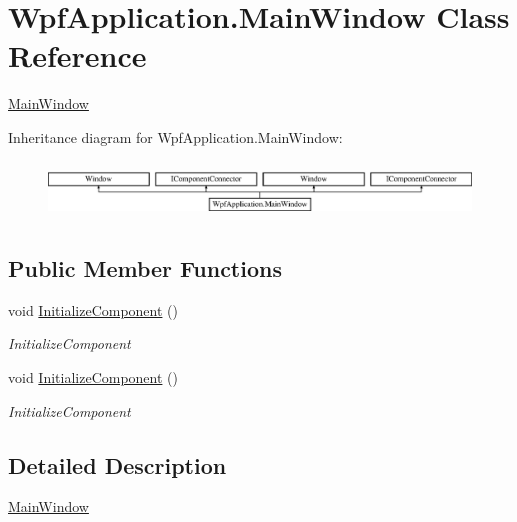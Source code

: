 \hypertarget{class_wpf_application_1_1_main_window}{\section{Wpf\-Application.\-Main\-Window Class Reference}
\label{class_wpf_application_1_1_main_window}
}


\hyperlink{class_wpf_application_1_1_main_window}{Main\-Window}  


Inheritance diagram for Wpf\-Application.\-Main\-Window\-:\begin{figure}[H]
\begin{center}
\leavevmode
\includegraphics[height=1.546961cm]{class_wpf_application_1_1_main_window}
\end{center}
\end{figure}
\subsection*{Public Member Functions}
\begin{DoxyCompactItemize}
\item 
void \hyperlink{class_wpf_application_1_1_main_window_a45cac8c6a884abb12768797ccf07451f}{Initialize\-Component} ()
\begin{DoxyCompactList}\small\item\em Initialize\-Component \end{DoxyCompactList}\item 
void \hyperlink{class_wpf_application_1_1_main_window_a45cac8c6a884abb12768797ccf07451f}{Initialize\-Component} ()
\begin{DoxyCompactList}\small\item\em Initialize\-Component \end{DoxyCompactList}\end{DoxyCompactItemize}


\subsection{Detailed Description}
\hyperlink{class_wpf_application_1_1_main_window}{Main\-Window} 



